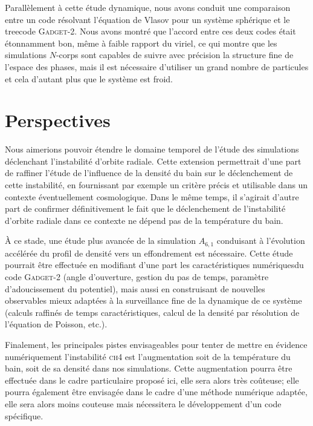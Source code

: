 Parallèlement à cette étude dynamique, nous avons conduit une
comparaison entre un code résolvant l'équation de Vlasov pour un
système sphérique et le treecode \textsc{Gadget-2}. Nous avons montré que
l'accord entre ces deux codes était étonnamment bon, même à
faible rapport du viriel,
ce qui montre que les simulations $N$-corps sont capables de suivre avec précision la
structure fine
de l'espace des phases, mais il est nécessaire d'utiliser un grand nombre de particules et cela d'autant plus que le système est froid.


\section{Perspectives}


Nous aimerions pouvoir étendre le domaine temporel de l'étude des
simulations déclenchant l'instabilité d'orbite radiale. Cette
extension permettrait d'une part de raffiner l'étude de l'influence de la
densité du bain sur le déclenchement de cette instabilité, en
fournissant par exemple un critère précis et utilisable dans un
contexte éventuellement cosmologique. Dans le même temps, il s'agirait
d'autre part de confirmer définitivement le fait que le déclenchement
de l'instabilité d'orbite radiale dans ce contexte ne dépend pas de la
température du bain.



À ce stade, une étude plus avancée de la simulation $A_{6,1}$
conduisant à l'évolution accélérée du profil de
densité vers un effondrement est nécessaire.  Cette étude pourrait
être effectuée en modifiant d'une part les caractéristiques
\og{}numériques\fg du code \textsc{Gadget-2} (angle d'ouverture, gestion du pas de temps,
paramètre d'adoucissement du potentiel), mais aussi en construisant de
nouvelles observables mieux adaptées à la surveillance fine de la
dynamique de ce système (calculs raffinés de temps
caractéristiques, calcul de la densité par résolution de
l'équation de Poisson, etc.).


Finalement, les principales pistes envisageables pour tenter de
mettre en évidence numériquement l'instabilité \textsc{ch4}  est
l'augmentation soit de la température du bain, soit de sa densité dans nos simulations. Cette
augmentation pourra être effectuée dans le cadre particulaire
proposé ici, elle sera alors très coûteuse; elle pourra également
être envisagée dans le cadre d'une méthode numérique
adaptée, elle sera alors moins couteuse mais nécessitera le
développement d'un code spécifique.

